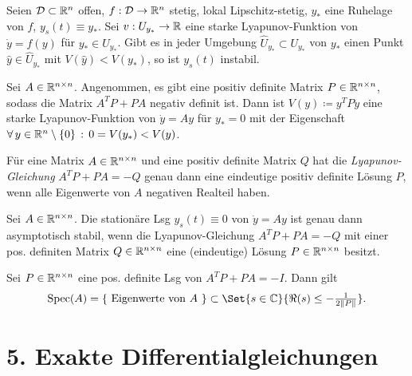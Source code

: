 \documentclass{cheat-sheet}
\newcommand{\D}{\mathcal{D}}
\DeclareMathOperator{\Spec}{Spec} %
\begin{document}
\begin{satz}
  Seien $\D \subset \R^n$ offen, $f : \D \to \R^n$ stetig, lokal Lipschitz-stetig, $y_{*}$ eine Ruhelage von $f$, $y_s(t) \equiv y_{*}$. Sei $v : U_{y_{*}} \to \mathbb{R}$ eine starke Lyapunov-Funktion von $\dot{y} = f(y)$ für $y_{*} \in U_{y_{*}}$. Gibt es in jeder Umgebung $\widehat{U}_{y_{*}} \subset U_{y_{*}}$ von $y_{*}$ einen Punkt $\hat{y} \in \widehat{U}_{y_*}$ mit $V(\hat{y}) < V(y_*)$, so ist $y_s(t)$ instabil.
\end{satz}


\begin{satz}
  Sei $A \in \mathbb{R}^{n \times n}$. Angenommen, es gibt eine positiv definite Matrix $P \in \mathbb{R}^{n \times n}$, sodass die Matrix $A^T P + PA$ negativ definit ist. Dann ist $V(y) \coloneqq y^T P y$ eine starke Lyapunov-Funktion von $\dot{y} = Ay$ für $y_{*} = 0$ mit der Eigenschaft $\forall \, {y \in \mathbb{R}^n \setminus \{ 0 \}} \,:\, 0 = V(y_*) < V(y)$.
\end{satz}

\begin{satz}
  Für eine Matrix $A \in \mathbb{R}^{n \times n}$ und eine positiv definite Matrix $Q$ hat die \emph{Lyapunov-Gleichung} $A^T P + PA = -Q$ genau dann eine eindeutige positiv definite Lösung $P$, wenn alle Eigenwerte von $A$ negativen Realteil haben.
\end{satz}

\begin{kor}
  Sei $A \in \mathbb{R}^{n \times n}$. Die stationäre Lsg $y_s(t) \equiv 0$ von $\dot{y} = Ay$ ist genau dann asymptotisch stabil, wenn die Lyapunov-Gleichung $A^T P + PA = - Q$ mit einer pos. definiten Matrix $Q \in \mathbb{R}^{n \times n}$ eine (eindeutige) Lösung $P \in \mathbb{R}^{n \times n}$ besitzt.
\end{kor}

\begin{satz}
  Sei $P \in \mathbb{R}^{n \times n}$ eine pos. definite Lsg von $A^T P + PA = -I$. Dann gilt
  \[ \Spec(A) = \{ \text{ Eigenwerte von $A$ } \} \subset \Set{s \in \C}{\Re(s) \leq - \tfrac{1}{2 \norm{P}}}. \]
\end{satz}

\section{5. Exakte Differentialgleichungen}
\end{document}
